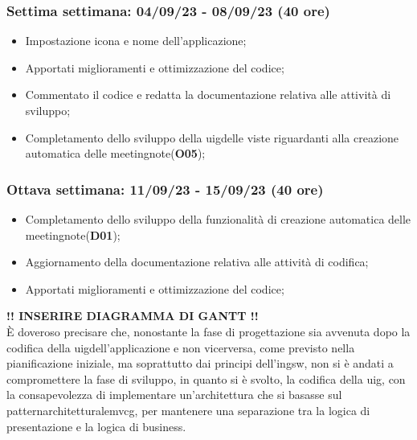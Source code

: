 \subsubsection{Settima settimana: 04/09/23 - 08/09/23 (40 ore)}
    \begin{itemize}
        \item Impostazione icona e nome dell'applicazione;
        \item Apportati miglioramenti e ottimizzazione del codice;
        \item Commentato il codice e redatta la documentazione relativa alle attività di sviluppo;
        \item Completamento dello sviluppo della \gls{uig}\glsoccur delle viste riguardanti alla creazione automatica delle \gls{meetingnote}\glsoccur  (\textbf{O05});
    \end{itemize}
\subsubsection{Ottava settimana: 11/09/23 - 15/09/23 (40 ore)}
    \begin{itemize}
        \item Completamento dello sviluppo della funzionalità di creazione automatica delle \gls{meetingnote}\glsoccur (\textbf{D01});
        \item Aggiornamento della documentazione relativa alle attività di codifica;
        \item Apportati miglioramenti e ottimizzazione del codice;
    \end{itemize}

\textbf{!! INSERIRE DIAGRAMMA DI GANTT !!} \\

È doveroso precisare che, nonostante la fase di progettazione sia avvenuta dopo la codifica della \gls{uig}\glsoccur dell'applicazione e non vicerversa, come previsto nella pianificazione iniziale, ma soprattutto dai principi dell'\gls{ingsw}\glsoccur, non si è andati a compromettere la fase di sviluppo, in quanto si è svolto, la codifica della \gls{uig}\glsoccur, con la consapevolezza di implementare un'architettura che si basasse sul \gls{patternarchitetturale}\glsoccur \Gls{mvcg}\glsoccur, per mantenere una separazione tra la logica di presentazione e la logica di business.\\

